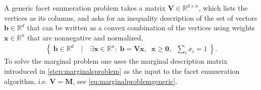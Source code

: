 \documentclass[aps,english,superscriptaddress,onecolumn,twoside,longbibliography,pra,floatfix,fleqn,nofootinbib]{revtex4-1}%
\theoremstyle{definition}
\begin{document}
A generic facet enumeration problem takes a matrix $\bm{V}\in\mathbb{R}^{d\times n}$, which lists the vertices as its columns, and asks for an inequality description of the set of vectors $\bm{b}\in\mathbb{R}^d$ that can be written as a convex combination of the vertices using weights $\bm{x}\in\mathbb{R}^n$ that are nonnegative and normalized,
\begin{align}
	\label{projsimplex}
	\left\{\: \bm{b}\in\mathbb{R}^d \quad\bigg|\quad \exists \bm{x}\in\mathbb{R}^n:\; \bm{b} = \bm{V}\bm{x} ,\;\; \bm{x}\geq \bm{0},\;\; {{\sum_i}{x_i}}=1 \:\right\}.
\end{align}
To solve the marginal problem one uses the marginal description matrix introduced in \cref{step:marginalsproblem} as the input to the facet enumeration algorithm, i.e. $\bm{V}=\bm{M}$, see \cref{eq:marginalproblemgeneric}.
\end{document}
